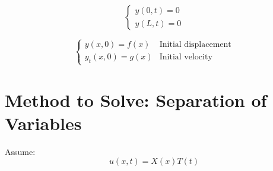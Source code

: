 \documentclass[a4paper,12pt]{article}
\begin{document}
\[
    \left\{
    \begin{array}{ll}
        y(0,t) = 0 \\
        y(L,t) = 0
    \end{array}
    \right.
\]


\[
    \left\{
    \begin{array}{ll}
        y(x,0) = f(x) & \text{Initial displacement} \\
        y_t(x,0) = g(x) & \text{Initial velocity}
    \end{array}
    \right.
\]

\section*{Method to Solve: Separation of Variables}
Assume:
\begin{equation*}
    u(x,t) = X(x) T(t)
\end{equation*}
\end{document}
